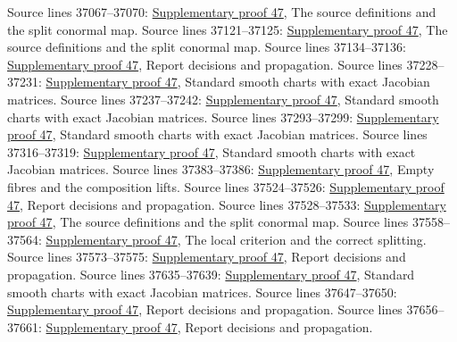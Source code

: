 \begin{AlgebraSourceRoutes}
 Source lines 37067--37070: \hyperlink{algebra_smooth_notes_20260928}{Supplementary proof 47}, The source definitions and the split conormal map.
 Source lines 37121--37125: \hyperlink{algebra_smooth_notes_20260928}{Supplementary proof 47}, The source definitions and the split conormal map.
 Source lines 37134--37136: \hyperlink{algebra_smooth_notes_20260928}{Supplementary proof 47}, Report decisions and propagation.
 Source lines 37228--37231: \hyperlink{algebra_smooth_notes_20260928}{Supplementary proof 47}, Standard smooth charts with exact Jacobian matrices.
 Source lines 37237--37242: \hyperlink{algebra_smooth_notes_20260928}{Supplementary proof 47}, Standard smooth charts with exact Jacobian matrices.
 Source lines 37293--37299: \hyperlink{algebra_smooth_notes_20260928}{Supplementary proof 47}, Standard smooth charts with exact Jacobian matrices.
 Source lines 37316--37319: \hyperlink{algebra_smooth_notes_20260928}{Supplementary proof 47}, Standard smooth charts with exact Jacobian matrices.
 Source lines 37383--37386: \hyperlink{algebra_smooth_notes_20260928}{Supplementary proof 47}, Empty fibres and the composition lifts.
 Source lines 37524--37526: \hyperlink{algebra_smooth_notes_20260928}{Supplementary proof 47}, Report decisions and propagation.
 Source lines 37528--37533: \hyperlink{algebra_smooth_notes_20260928}{Supplementary proof 47}, The source definitions and the split conormal map.
 Source lines 37558--37564: \hyperlink{algebra_smooth_notes_20260928}{Supplementary proof 47}, The local criterion and the correct splitting.
 Source lines 37573--37575: \hyperlink{algebra_smooth_notes_20260928}{Supplementary proof 47}, Report decisions and propagation.
 Source lines 37635--37639: \hyperlink{algebra_smooth_notes_20260928}{Supplementary proof 47}, Standard smooth charts with exact Jacobian matrices.
 Source lines 37647--37650: \hyperlink{algebra_smooth_notes_20260928}{Supplementary proof 47}, Report decisions and propagation.
 Source lines 37656--37661: \hyperlink{algebra_smooth_notes_20260928}{Supplementary proof 47}, Report decisions and propagation.

\end{AlgebraSourceRoutes}
